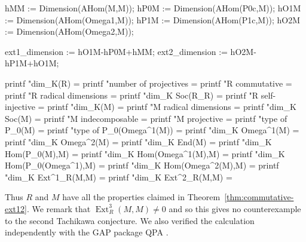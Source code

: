\documentclass[a4paper]{amsart}
\theoremstyle{definition}
\theoremstyle{remark}
\numberwithin{equation}{section}
\newcommand{\Ext}{\operatorname{Ext}}
\begin{document}
\begin{MagmaCode}
hMM  := Dimension(AHom(M,M));
hP0M := Dimension(AHom(P0c,M));
hO1M := Dimension(AHom(Omega1,M));
hP1M := Dimension(AHom(P1c,M));
hO2M := Dimension(AHom(Omega2,M));

ext1_dimension := hO1M-hP0M+hMM;
ext2_dimension := hO2M-hP1M+hO1M;

printf "dim_K(R)                    = %
printf "number of projectives       = %
printf "R commutative               = %
printf "R radical dimensions        = %
printf "dim_K Soc(R_R)              = %
printf "R self-injective            = %
printf "dim_K(M)                    = %
printf "M radical dimensions        = %
printf "dim_K Soc(M)                = %
printf "M indecomposable            = %
printf "M projective                = %
printf "type of P_0(M)              = %
printf "type of P_0(Omega^1(M))     = %
printf "dim_K Omega^1(M)            = %
printf "dim_K Omega^2(M)            = %
printf "dim_K End(M)                = %
printf "dim_K Hom(P_0(M),M)         = %
printf "dim_K Hom(Omega^1(M),M)     = %
printf "dim_K Hom(P_0(Omega^1),M)   = %
printf "dim_K Hom(Omega^2(M),M)     = %
printf "dim_K Ext^1_R(M,M)          = %
printf "dim_K Ext^2_R(M,M)          = %
\end{MagmaCode}
Thus $R$ and $M$ have all the properties claimed in Theorem~\ref{thm:commutative-ext12}. We remark that $\Ext_R^3(M,M) \neq 0$ and so this gives no counterexample to the second Tachikawa conjecture. We also verified the calculation independently with the GAP package QPA \cite{QPA}.
\end{document}
